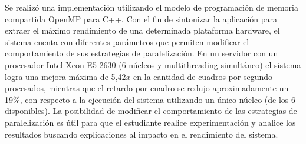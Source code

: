 Se realizó una implementación utilizando el modelo de programación de memoria
compartida OpenMP para C++. Con el fin de sintonizar la aplicación para extraer
el máximo rendimiento de una determinada plataforma hardware, el sistema cuenta
con diferentes parámetros que permiten modificar el comportamiento de sus
estrategias de paralelización. En un servidor con un procesador Intel Xeon
E5-2630 (6 núcleos y multithreading simultáneo) el sistema logra una mejora
máxima de 5,42$x$ en la cantidad de cuadros por segundo procesados, mientras que
el retardo por cuadro se redujo aproximadamente un 19\%, con respecto a la
ejecución del sistema utilizando un único núcleo (de los 6 disponibles). La
posibilidad de modificar el comportamiento de las estrategias de paralelización
es útil para que el estudiante realice experimentación y analice los resultados
buscando explicaciones al impacto en el rendimiento del sistema.

\vfill
\pagebreak
